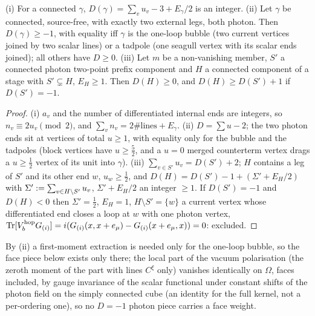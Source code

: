 \begin{lemma}\label{lem:a02:CENpp}
(i) For a connected $\gamma$, $D(\gamma)=\sum_vu_v-3+E_\gamma/2$ is an integer. (ii) Let $\gamma$ be connected, source-free, with exactly two external legs, both photon. Then $D(\gamma)\ge-1$, with equality iff $\gamma$ is the one-loop bubble (two current vertices joined by two scalar lines) or a tadpole (one seagull vertex with its scalar ends joined); all others have $D\ge0$. (iii) Let $m$ be a non-vanishing member, $S'$ a connected photon two-point prefix component and $H$ a connected component of a stage with $S'\subsetneq H$, $E_H\ge1$. Then $D(H)\ge0$, and $D(H)\ge D(S')+1$ if $D(S')=-1$.
\end{lemma}
\begin{proof}
(i) $a_v$ and the number of differentiated internal ends are integers, so $n_v\equiv2u_v\pmod2$, and $\sum_vn_v=2\#\text{lines}+E_\gamma$. (ii) $D=\sum u-2$; the two photon ends sit at vertices of total $u\ge1$, with equality only for the bubble and the tadpoles (block vertices have $u\ge\frac52$, and a $u=0$ merged counterterm vertex drags a $u\ge\frac12$ vertex of its unit into $\gamma$). (iii) $\sum_{v\in S'}u_v=D(S')+2$; $H$ contains a leg of $S'$ and its other end $w$, $u_w\ge\frac12$, and $D(H)=D(S')-1+(\Sigma'+E_H/2)$ with $\Sigma':=\sum_{v\in H\setminus S'}u_v$, $\Sigma'+E_H/2$ an integer $\ge1$. If $D(S')=-1$ and $D(H)<0$ then $\Sigma'=\frac12$, $E_H=1$, $H\setminus S'=\{w\}$ a current vertex whose differentiated end closes a loop at $w$ with one photon vertex, $\operatorname{Tr}[V^{\mathrm{hop}}_bG_{(i)}]=i(G_{(i)}(x,x+e_\mu)-G_{(i)}(x+e_\mu,x))=0$: excluded.
\end{proof}
By (ii) a first-moment extraction is needed only for the one-loop bubble, so the face piece below exists only there; the local part of the vacuum polarisation (the zeroth moment of the part with lines $C^{\xi}$ only) vanishes identically on $\Omega$, faces included, by gauge invariance of the scalar functional under constant shifts of the photon field on the simply connected cube (an identity for the full kernel, not a per-ordering one), so no $D=-1$ photon piece carries a face weight.

